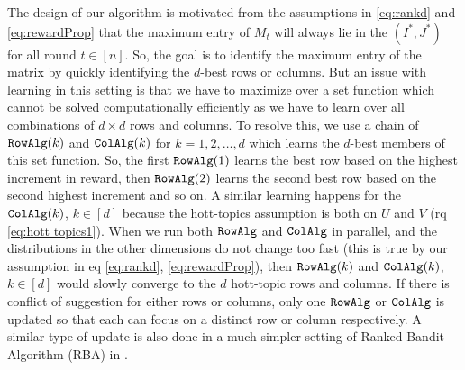 The design of our algorithm is motivated from the assumptions in  \eqref{eq:rankd} and \eqref{eq:rewardProp} that the maximum entry of $M_{t}$ will always lie in the $(I^\ast, J^\ast)$ for all round $t\in [n]$. So, the goal is to identify the maximum entry of the matrix by quickly identifying the $d$-best rows or columns. But an issue with learning in this setting is that we have to maximize over a set function which cannot be solved computationally efficiently as we have to learn over all combinations of $d\times d$ rows and columns. To resolve this, we use a chain of ${\tt RowAlg}(k)$ and ${\tt ColAlg}(k)$ for $k=1,2,\ldots,d$ which learns the $d$-best members of this set function. So, the first ${\tt RowAlg}(1)$ learns the best row based on the highest increment in reward, then ${\tt RowAlg}(2)$ learns the second best row based on the second highest increment and so on. A similar learning happens for the ${\tt ColAlg}(k)$, $k\in [d]$ because the hott-topics assumption is both on $U$ and $V$ (rq \eqref{eq:hott topics1}). When we run both ${\tt RowAlg}$ and ${\tt ColAlg}$ in parallel, and the distributions in the other dimensions do not change too fast (this is true by our assumption in eq \eqref{eq:rankd}, \eqref{eq:rewardProp}), then ${\tt RowAlg}(k)$ and ${\tt ColAlg}(k)$, $k\in [d]$ would slowly converge to the $d$ hott-topic rows and columns.  If there is conflict of suggestion for either rows or columns, only one ${\tt RowAlg}$ or ${\tt ColAlg}$ is updated so that each can focus on a distinct row or column respectively. A similar type of update is also done in a much simpler setting of Ranked Bandit Algorithm (RBA) in \citet{radlinski2008learning}.


